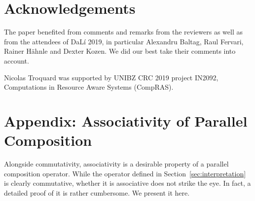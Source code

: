 \documentclass{llncs}
\begin{document}
\section{Acknowledgements}
The paper benefited from comments and remarks from the reviewers as well as from the attendees of DaL\'i 2019, 
in particular Alexandru Baltag, Raul Fervari, Rainer H\"ahnle and Dexter Kozen.
We did our best take their comments into account. 

Nicolas Troquard was supported by 
UNIBZ CRC 2019 project IN2092, Computations in Resource Aware Systems (CompRAS).

\appendix
\section{Appendix: Associativity of Parallel Composition}
%

\newcommand{\modla}{\mathsf a}
\newcommand{\readseta}{\mathsf {Rda}}
\newcommand{\writeseta}{\mathsf {Wra}}
\newcommand{\valuseta}{\mathsf {Va}}

Alongside commutativity, associativity is a desirable property of a parallel composition operator. While the operator defined in Section~\ref{sec:interpretation} is clearly commutative, whether it is associative does not strike the eye. In fact, a detailed proof of it is rather cumbersome. We present it here.
\end{document}
